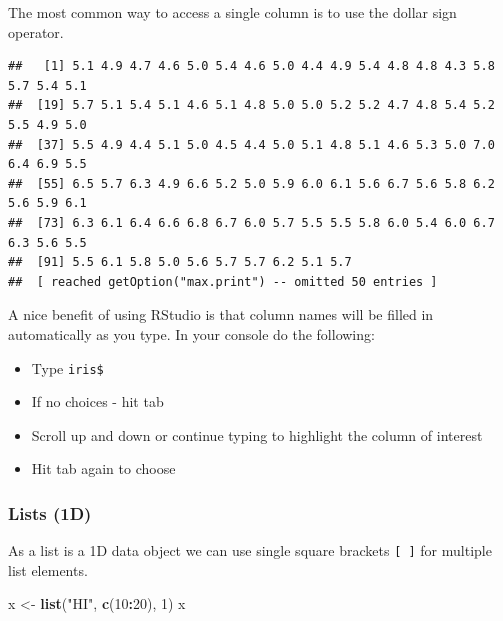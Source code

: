 \documentclass[
]{book}
\newenvironment{Shaded}{\begin{snugshade}}{\end{snugshade}}
\newcommand{\DecValTok}[1]{\textcolor[rgb]{0.00,0.00,0.81}{#1}}
\newcommand{\KeywordTok}[1]{\textcolor[rgb]{0.13,0.29,0.53}{\textbf{#1}}}
\newcommand{\NormalTok}[1]{#1}
\newcommand{\OperatorTok}[1]{\textcolor[rgb]{0.81,0.36,0.00}{\textbf{#1}}}
\newcommand{\StringTok}[1]{\textcolor[rgb]{0.31,0.60,0.02}{#1}}
\providecommand{\tightlist}{%
  \setlength{\itemsep}{0pt}\setlength{\parskip}{0pt}}
\theoremstyle{definition}
\theoremstyle{definition}
\theoremstyle{definition}
\theoremstyle{remark}
\begin{document}
The most common way to access a single column is to use the dollar sign operator.

\begin{Shaded}
\end{Shaded}

\begin{verbatim}
##   [1] 5.1 4.9 4.7 4.6 5.0 5.4 4.6 5.0 4.4 4.9 5.4 4.8 4.8 4.3 5.8 5.7 5.4 5.1
##  [19] 5.7 5.1 5.4 5.1 4.6 5.1 4.8 5.0 5.0 5.2 5.2 4.7 4.8 5.4 5.2 5.5 4.9 5.0
##  [37] 5.5 4.9 4.4 5.1 5.0 4.5 4.4 5.0 5.1 4.8 5.1 4.6 5.3 5.0 7.0 6.4 6.9 5.5
##  [55] 6.5 5.7 6.3 4.9 6.6 5.2 5.0 5.9 6.0 6.1 5.6 6.7 5.6 5.8 6.2 5.6 5.9 6.1
##  [73] 6.3 6.1 6.4 6.6 6.8 6.7 6.0 5.7 5.5 5.5 5.8 6.0 5.4 6.0 6.7 6.3 5.6 5.5
##  [91] 5.5 6.1 5.8 5.0 5.6 5.7 5.7 6.2 5.1 5.7
##  [ reached getOption("max.print") -- omitted 50 entries ]
\end{verbatim}

A nice benefit of using RStudio is that column names will be filled in automatically as you type. In your console do the following:

\begin{itemize}
\tightlist
\item
  Type \texttt{iris\$}\\
\item
  If no choices - hit tab
\item
  Scroll up and down or continue typing to highlight the column of interest\\
\item
  Hit tab again to choose
\end{itemize}

\hypertarget{lists-1d}{%
\subsubsection{Lists (1D)}\label{lists-1d}}

As a list is a 1D data object we can use single square brackets \texttt{{[}\ {]}} for multiple list elements.

\begin{Shaded}
\begin{Highlighting}[]
\NormalTok{x <-}\StringTok{ }\KeywordTok{list}\NormalTok{(}\StringTok{"HI"}\NormalTok{, }\KeywordTok{c}\NormalTok{(}\DecValTok{10}\OperatorTok{:}\DecValTok{20}\NormalTok{), }\DecValTok{1}\NormalTok{)}
\NormalTok{x}
\end{Highlighting}
\end{Shaded}
\end{document}
